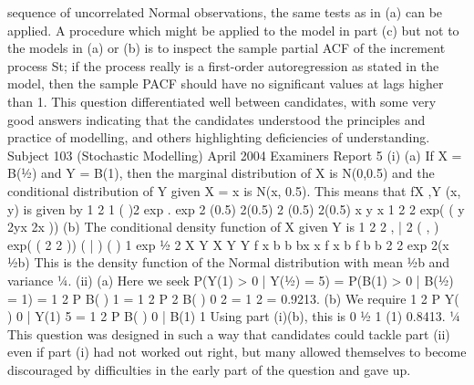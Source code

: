 sequence of uncorrelated Normal observations, the same tests as in (a)
can be applied.
A procedure which might be applied to the model in part (c) but not to
the models in (a) or (b) is to inspect the sample partial ACF of the
increment process St; if the process really is a first-order
autoregression as stated in the model, then the sample PACF should
have no significant values at lags higher than 1.
This question differentiated well between candidates, with some very good answers indicating
that the candidates understood the principles and practice of modelling, and others
highlighting deficiencies of understanding.
Subject 103 (Stochastic Modelling) April 2004 Examiners Report
5 (i) (a) If X = B(½) and Y = B(1), then the marginal distribution of X is N(0,0.5)
and the conditional distribution of Y given X = x is N(x, 0.5).
This means that fX ,Y (x, y) is given by
1 2 1 ( )2
exp . exp
2 (0.5) 2(0.5) 2 (0.5) 2(0.5)
x y x
1 2 2
exp( ( y 2yx 2x ))
(b) The conditional density function of X given Y is
1 2 2
,
|
2
( , ) exp( ( 2 2 ))
( | )
( ) 1 exp ½
2
X Y
X Y
Y
f x b b bx x
f x b
f b b
2 2
exp 2(x ½b)
This is the density function of the Normal distribution with mean ½b
and variance ¼.
(ii) (a) Here we seek P(Y(1) > 0 | Y(½) = 5) = P(B(1) > 0 | B(½) = 1)
= 1
2 P B( ) 1
= 1
2 P 2 B( ) 0 2
= 1 2 = 0.9213.
(b) We require 1
2 P Y( ) 0 | Y(1) 5 = 1
2 P B( ) 0 | B(1) 1
Using part (i)(b), this is
0 ½
1 (1) 0.8413.
¼
This question was designed in such a way that candidates could tackle part (ii) even if part (i)
had not worked out right, but many allowed themselves to become discouraged by difficulties
in the early part of the question and gave up.
